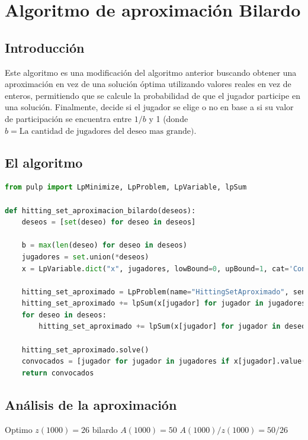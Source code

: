 \documentclass{estilo}
\begin{document}
\newpage

\section{Algoritmo de aproximación Bilardo}

\subsection{Introducción}

Este algoritmo es una modificación del algoritmo anterior buscando obtener una aproximación en vez de una solución óptima utilizando valores reales en vez de enteros, permitiendo que se calcule la probabilidad de que el jugador participe en una solución. Finalmente, decide si el jugador se elige o no en base a si su valor de participación se encuentra entre $1/b$  y 1 (donde $b = \text{La cantidad de jugadores del deseo mas grande)}$.

\subsection{El algoritmo}

\begin{lstlisting}[language=Python]
from pulp import LpMinimize, LpProblem, LpVariable, lpSum

def hitting_set_aproximacion_bilardo(deseos):
    deseos = [set(deseo) for deseo in deseos]
    
    b = max(len(deseo) for deseo in deseos)
    jugadores = set.union(*deseos)
    x = LpVariable.dict("x", jugadores, lowBound=0, upBound=1, cat='Continuous')
    
    hitting_set_aproximado = LpProblem(name="HittingSetAproximado", sense=LpMinimize)
    hitting_set_aproximado += lpSum(x[jugador] for jugador in jugadores)
    for deseo in deseos:
        hitting_set_aproximado += lpSum(x[jugador] for jugador in deseo) >= 1
        
    hitting_set_aproximado.solve()
    convocados = [jugador for jugador in jugadores if x[jugador].value() >= 1/b]
    return convocados
\end{lstlisting}

\subsection{Análisis de la aproximación}

Optimo $z(1000) = 26$ bilardo $A(1000) = 50$
$A(1000)/z(1000) = 50/26 $
\end{document}
